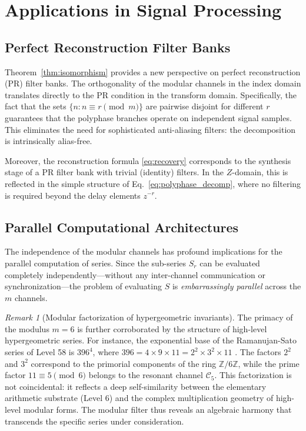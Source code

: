 \documentclass[12pt,a4paper]{article}
\theoremstyle{plain}
\theoremstyle{definition}
\theoremstyle{remark}
\newtheorem{remark}[theorem]{Remark}
\begin{document}
\section{Applications in Signal Processing}
\label{sec:DSP}

\subsection{Perfect Reconstruction Filter Banks}
Theorem~\ref{thm:isomorphism} provides a new perspective on perfect reconstruction (PR) filter banks. The orthogonality of the modular channels in the index domain translates directly to the PR condition in the transform domain. Specifically, the fact that the sets \(\{n : n \equiv r \pmod{m}\}\) are pairwise disjoint for different \(r\) guarantees that the polyphase branches operate on independent signal samples. This eliminates the need for sophisticated anti-aliasing filters: the decomposition is intrinsically alias-free.

Moreover, the reconstruction formula \eqref{eq:recovery} corresponds to the synthesis stage of a PR filter bank with trivial (identity) filters. In the \(Z\)-domain, this is reflected in the simple structure of Eq.~\eqref{eq:polyphase_decomp}, where no filtering is required beyond the delay elements \(z^{-r}\).

\subsection{Parallel Computational Architectures}
The independence of the modular channels has profound implications for the parallel computation of series. Since the sub-series \(S_r\) can be evaluated completely independently---without any inter-channel communication or synchronization---the problem of evaluating \(S\) is \emph{embarrassingly parallel} across the \(m\) channels.

\begin{remark}[Modular factorization of hypergeometric invariants]
The primacy of the modulus $m=6$ is further corroborated by the structure of high-level hypergeometric series. For instance, the exponential base of the Ramanujan-Sato series of Level 58 is $396^4$, where $396 = 4 \times 9 \times 11 = 2^2 \times 3^2 \times 11$ \cite{chudnovsky}. The factors $2^2$ and $3^2$ correspond to the primorial components of the ring $\mathbb{Z}/6\mathbb{Z}$, while the prime factor $11 \equiv 5 \pmod{6}$ belongs to the resonant channel $\mathcal{C}_5$. This factorization is not coincidental: it reflects a deep self-similarity between the elementary arithmetic substrate (Level 6) and the complex multiplication geometry of high-level modular forms. The modular filter thus reveals an algebraic harmony that transcends the specific series under consideration.
\end{remark}
\end{document}
